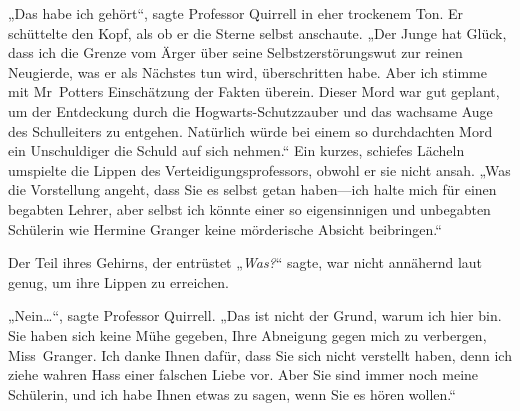 „Das habe ich gehört“, sagte Professor Quirrell in eher trockenem Ton. Er schüttelte den Kopf, als ob er die Sterne selbst anschaute. „Der Junge hat Glück, dass ich die Grenze vom Ärger über seine Selbstzerstörungswut zur reinen Neugierde, was er als Nächstes tun wird, überschritten habe. Aber ich stimme mit Mr~Potters Einschätzung der Fakten überein. Dieser Mord war gut geplant, um der Entdeckung durch die Hogwarts-Schutzzauber und das wachsame Auge des Schulleiters zu entgehen. Natürlich würde bei einem so durchdachten Mord ein Unschuldiger die Schuld auf sich nehmen.“
Ein kurzes, schiefes Lächeln umspielte die Lippen des Verteidigungsprofessors, obwohl er sie nicht ansah.
„Was die Vorstellung angeht, dass Sie es selbst getan haben—ich halte mich für einen begabten Lehrer, aber selbst ich könnte einer so eigensinnigen und unbegabten Schülerin wie Hermine Granger keine mörderische Absicht beibringen.“

Der Teil ihres Gehirns, der entrüstet „\emph{Was?}“ sagte, war nicht annähernd laut genug, um ihre Lippen zu erreichen.

„Nein…“, sagte Professor Quirrell. „Das ist nicht der Grund, warum ich hier bin. Sie haben sich keine Mühe gegeben, Ihre Abneigung gegen mich zu verbergen, Miss~Granger. Ich danke Ihnen dafür, dass Sie sich nicht verstellt haben, denn ich ziehe wahren Hass einer falschen Liebe vor. Aber Sie sind immer noch meine Schülerin, und ich habe Ihnen etwas zu sagen, wenn Sie es hören wollen.“

